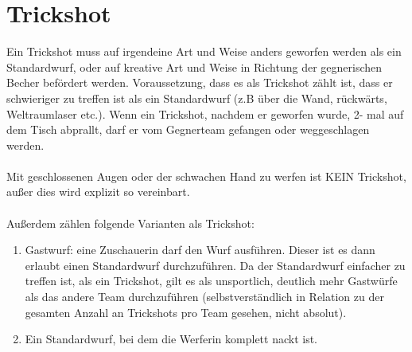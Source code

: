 \documentclass[a5paper, 12pt]{book}
\begin{document}
\section{Trickshot}\label{sec:trickshot}
Ein Trickshot muss auf irgendeine Art und Weise anders geworfen werden als ein Standardwurf, oder auf kreative Art und Weise in Richtung der gegnerischen Becher befördert werden. Voraussetzung, dass es als Trickshot zählt ist, dass er schwieriger zu treffen ist als ein Standardwurf (z.B über die Wand, rückwärts, Weltraumlaser etc.). Wenn ein Trickshot, nachdem er geworfen wurde, 2- mal auf dem Tisch abprallt, darf er vom Gegnerteam gefangen oder weggeschlagen werden.\\\\
Mit geschlossenen Augen oder der schwachen Hand zu werfen ist KEIN Trickshot, außer dies wird explizit so vereinbart.\\\\
Außerdem zählen folgende Varianten als Trickshot:
\begin{enumerate}[(1)]
    \item Gastwurf: eine Zuschauerin darf den Wurf ausführen. Dieser ist es dann erlaubt einen Standardwurf durchzuführen. Da der Standardwurf einfacher zu treffen ist, als ein Trickshot, gilt es als unsportlich, deutlich mehr Gastwürfe als das andere Team durchzuführen (selbstverständlich in Relation zu der gesamten Anzahl an Trickshots pro Team gesehen, nicht absolut).
    \item Ein Standardwurf, bei dem die Werferin komplett nackt ist.
\end{enumerate}
\end{document}
